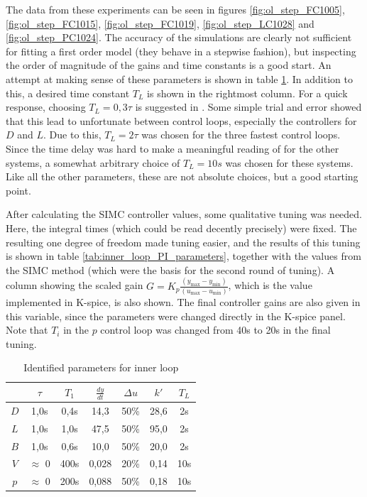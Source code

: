 \documentclass[12pt]{article}
\begin{document}
The data from these experiments can be seen in figures \ref{fig:ol_step_FC1005}, \ref{fig:ol_step_FC1015}, \ref{fig:ol_step_FC1019}, \ref{fig:ol_step_LC1028} and \ref{fig:ol_step_PC1024}. The accuracy of the simulations are clearly not sufficient for fitting a first order model (they behave in a stepwise fashion), but inspecting the order of magnitude of the gains and time constants is a good start. An attempt at making sense of these parameters is shown in table \ref{tab:inner_loop_step_responses}. In addition to this, a desired time constant $T_L$ is shown in the rightmost column. For a quick response, choosing $T_L = 0,3\tau$ is suggested in \cite{balchen}. Some simple trial and error showed that this lead to unfortunate between control loops, especially the controllers for $D$ and $L$. Due to this, $T_L = 2\tau$ was chosen for the three fastest control loops. Since the time delay was hard to make a meaningful reading of for the other systems, a somewhat arbitrary choice of $T_L = 10s$ was chosen for these systems. Like all the other parameters, these are not absolute choices, but a good starting point.

After calculating the SIMC controller values, some qualitative tuning was needed. Here, the integral times (which could be read decently precisely) were fixed. The resulting one degree of freedom made tuning easier, and the results of this tuning is shown in table \ref{tab:inner_loop_PI_parameters}, together with the values from the SIMC method (which were the basis for the second round of tuning). A column showing the scaled gain $G = K_p \frac{(y_{\max} - y_{\min})}{(u_{\max} - u_{\min})}$, which is the value implemented in K-spice, is also shown. The final controller gains are also given in this variable, since the parameters were changed directly in the K-spice panel. Note that $T_i$ in the $p$ control loop was changed from 40s to 20s in the final tuning.


\begin{table}
\centering
\begin{tabular}{c | c | c | c | c | c || c}
& $\tau$ & $T_1$ & $\frac{dy}{dt}$ & $\Delta u$ & $k'$ & $T_L$ \\ \hline
$D$ & 1,0s & 0,4s & 14,3 & 50\% & 28,6 & 2s \\
$L$ & 1,0s & 1,0s & 47,5 & 50\% & 95,0 & 2s \\
$B$ & 1,0s & 0,6s & 10,0 & 50\% & 20,0 & 2s \\
$V$ & $\approx$ 0 & 400s & 0,028 & 20\% & 0,14 & 10s \\
$p$ & $\approx$ 0 & 200s & 0,088 & 50\% & 0,18 & 10s
\end{tabular}
\caption{Identified parameters for inner loop}
\label{tab:inner_loop_step_responses}
\end{table}
\end{document}
